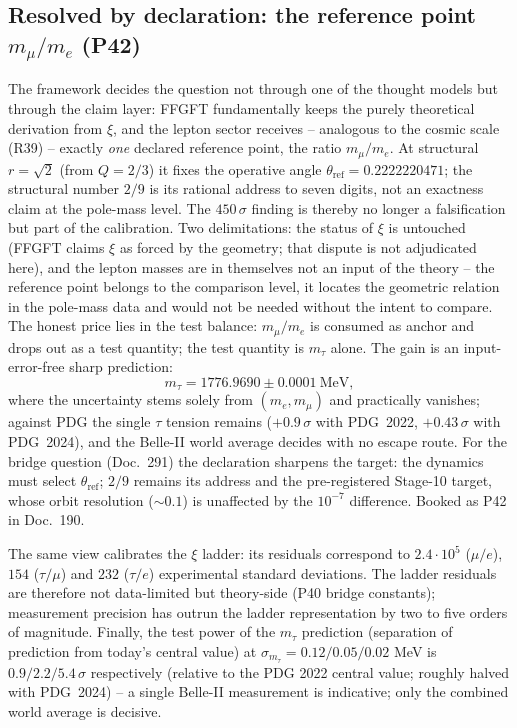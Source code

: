 \subsection{Resolved by declaration: the reference point $m_\mu/m_e$ (P42)}
The framework decides the question not through one of the thought models but
through the claim layer: FFGFT fundamentally keeps the purely theoretical
derivation from $\xi$, and the lepton sector receives -- analogous to the
cosmic scale (R39) -- exactly \emph{one} declared reference point, the
ratio $m_\mu/m_e$. At structural $r=\sqrt2$ (from $Q=2/3$) it fixes the
operative angle $\theta_{\text{ref}}=0.2222220471$; the structural number
$2/9$ is its rational address to seven digits, not an exactness claim at
the pole-mass level. The $450\,\sigma$ finding is thereby no longer a
falsification but part of the calibration. Two delimitations: the status of
$\xi$ is untouched (FFGFT claims $\xi$ as forced by the geometry; that
dispute is not adjudicated here), and the lepton masses are in themselves
not an input of the theory -- the reference point belongs to the comparison
level, it locates the geometric relation in the pole-mass data and would
not be needed without the intent to compare. The honest price lies in the
test balance: $m_\mu/m_e$ is consumed as anchor and drops out as a test
quantity; the test quantity is $m_\tau$ alone. The gain is an
input-error-free sharp prediction:
\begin{equation}
  m_\tau = 1776.9690 \pm 0.0001\ \text{MeV},
\end{equation}
where the uncertainty stems solely from $(m_e, m_\mu)$ and practically
vanishes; against PDG the single $\tau$ tension remains ($+0.9\,\sigma$ with
PDG~2022, $+0.43\,\sigma$ with PDG~2024), and the
Belle-II world average decides with no escape route. For the bridge
question (Doc.~291) the declaration sharpens the target: the dynamics must
select $\theta_{\text{ref}}$; $2/9$ remains its address and the
pre-registered Stage-10 target, whose orbit resolution ($\sim0.1$) is
unaffected by the $10^{-7}$ difference. Booked as P42 in Doc.~190.

The same view calibrates the $\xi$ ladder: its residuals correspond to
$2.4\cdot10^{5}$ ($\mu/e$), $154$ ($\tau/\mu$) and $232$ ($\tau/e$)
experimental standard deviations. The ladder residuals are therefore not
data-limited but theory-side (P40 bridge constants); measurement precision
has outrun the ladder representation by two to five orders of magnitude.
Finally, the test power of the $m_\tau$ prediction (separation of
prediction from today's central value) at
$\sigma_{m_\tau}=0.12/0.05/0.02$ MeV is $0.9/2.2/5.4\,\sigma$
respectively (relative to the PDG 2022 central value; roughly halved with
PDG~2024) -- a single Belle-II measurement is indicative; only the
combined world average is decisive.

